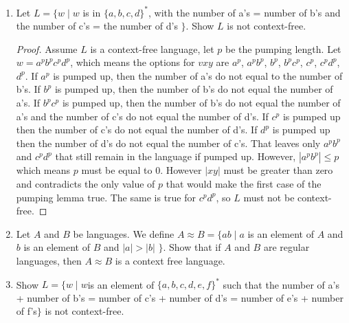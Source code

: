 \documentclass{article}
\begin{document}
\begin{enumerate}
\begin{proof}
            \end{proof}
        \item Let $L=\{w\mid w $ is in $\{a,b,c,d\}^*$, with the number of a's = number of b's and the number of c's = the number of d's $\}$. Show $L$ is not context-free.
            \begin{proof}
                Assume $L$ is a context-free language, let $p$ be the pumping length. Let $w=a^pb^pc^pd^p$, which means the options for $vxy$ are $a^p$, $a^pb^p$, $b^p$, $b^pc^p$, $c^p$, $c^pd^p$, $d^p$. If $a^p$ is pumped up, then the number of a's do not equal to the number of b's. If $b^p$ is pumped up, then the number of b's do not equal the number of a's. If $b^pc^p$ is pumped up, then the number of b's do not equal the number of a's and the number of c's do not equal the number of d's. If $c^p$ is pumped up then the number of c's do not equal the number of d's. If $d^p$ is pumped up then the number of d's do not equal the number of c's. That leaves only $a^pb^p$ and $c^pd^p$ that still remain in the language if pumped up. However, $|a^pb^p| \leq p$ which means $p$ must be equal to 0. However $|xy|$ must be greater than zero and contradicts the only value of $p$ that would make the first case of the pumping lemma true. The same is true for $c^pd^p$, so $L$ must not be context-free.
            \end{proof}
        \item Let $A$ and $B$ be languages. We define $A\approx B = \{ab \mid a $ is an element of $A$ and $b$ is an element of $B$ and $|a| > |b|$ $\}$. Show that if $A$ and $B$ are regular languages, then $A\approx B$ is a context free language.

        \item Show $L = \{w\mid w $is an element of $\{a,b,c,d,e,f\}^*$ such that the number of a's + number of b's = number of c's + number of d's = number of e's + number of f's$ \}$ is not context-free.
    \end{enumerate}
\end{document}
